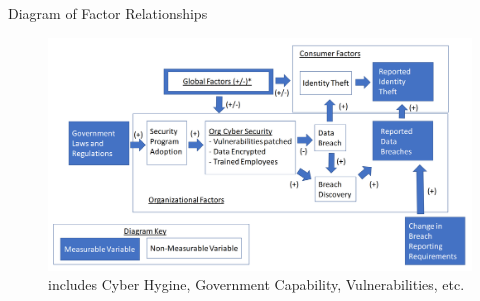 \documentclass[10pt]{beamer}
\begin{document}
\begin{frame}{Diagram of Factor Relationships}
    \begin{figure}
   \label{fig:diagram}
	\includegraphics[width=\textwidth]{Figures/Breach_FlowChart_v1.png}
	\caption{\small * includes Cyber Hygine, Government Capability, Vulnerabilities, etc.} 
    \end{figure}
\end{frame}
\end{document}
